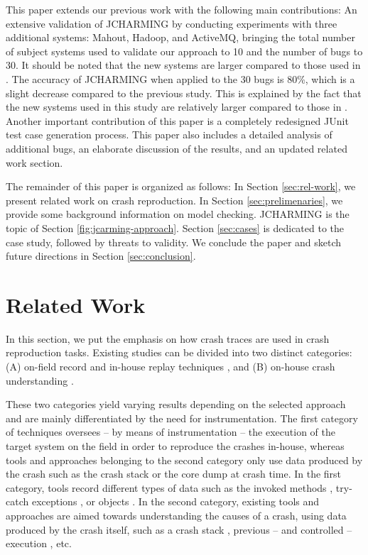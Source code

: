 \documentclass[times, doublespace]{smrauth}
\begin{document}
This paper extends our previous work \cite{Nayrolles2015} with the following main contributions:
An extensive validation of JCHARMING by conducting experiments with three
additional systems: Mahout, Hadoop, and ActiveMQ,
bringing the total number of subject systems used to
validate our approach to 10 and the number of bugs to 30.
It should be noted that the new systems are larger compared to those used in \cite{Nayrolles2015}.
The accuracy of JCHARMING when applied to the 30 bugs is 80\%,
which is a slight decrease compared to the previous study.
This is explained by the fact that the new systems used in
this study are relatively larger compared to those in \cite{Nayrolles2015}.
Another important contribution of this paper is a completely redesigned
JUnit test case generation process.
This paper also includes a detailed
analysis of additional bugs, an elaborate discussion of the
results, and an updated related work section.

The remainder of this paper is organized as follows: In Section
\ref{sec:rel-work}, we present related work on crash reproduction. In Section \ref{sec:prelimenaries}, we provide some background information on model
checking. JCHARMING is the topic of Section \ref{fig:jcarming-approach}. Section \ref{sec:cases}
is dedicated to the case study, followed by threats to validity.
We conclude the paper and sketch future directions in Section
\ref{sec:conclusion}.


\section{Related Work\label{sec:rel-work}}

In this section, we put the emphasis on how crash traces are used in crash reproduction tasks.
Existing studies can be divided into two distinct categories: (A) on-field record and in-house replay techniques \cite{Steven2000,Narayanasamy2005,Artzi2008,Roehm2015}, and (B) on-house crash understanding \cite{Jin2012,Jin2013,Zuddas2014,Chen2013a,Nayrolles2015}.

These two categories yield varying results depending on the selected approach and are mainly differentiated by the need for instrumentation.
The first category of techniques oversees -- by means of instrumentation -- the execution of the target system on the field in order to reproduce the crashes in-house, whereas tools and approaches belonging to the second category only use data produced by the crash such as the crash stack or the core dump at crash time. In the first category, tools record different types of data such as the invoked methods \cite{Narayanasamy2005}, try-catch exceptions \cite{Rossler2013}, or objects \cite{Jaygarl}. In the second category, existing tools and approaches are aimed towards understanding the causes of a crash, using data produced by the crash itself, such as a crash stack \cite{Chen2013a}, previous -- and controlled -- execution \cite{Zuddas2014}, etc.
\end{document}
